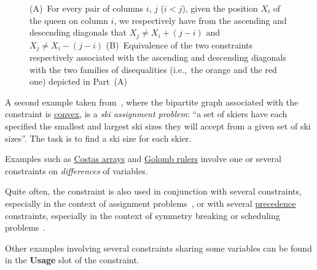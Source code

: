 \begin{ctrdesc}
\begin{figure}[!h]
\caption{\label{fig:alldifferent2a}
(A)~For every pair of columns $i$, $j$ ($i<j$), given the position $X_i$ of the queen on column $i$, we respectively have from the ascending and descending diagonals that $X_j\neq X_i+(j-i)$ and $X_j\neq X_i-(j-i)$
(B)~Equivalence of the two  constraints respectively associated with the ascending and descending diagonals with the two families of disequalities (i.e.,~the orange and the red one) depicted in Part~(A)}
\end{figure}

A second example taken from~\cite{AsratianDenleyHaggkvist98}, where the bipartite graph associated
with the  constraint is \hyperlink{convex_bipartite_graph}{convex}, is a
\emph{ski assignment problem}:
``a set of skiers have each specified the smallest and largest ski sizes they will accept from a given set of ski sizes''.
The task is to find a ski size for each skier.

Examples such as
\hyperlink{Costas_arrays}{Costas arrays} and
\hyperlink{Golomb_ruler}{Golomb rulers}
involve one or several  constraints on \emph{differences} of variables.

Quite often, the  constraint is also used in conjunction
with several \hyperlink{Celement}{} constraints, especially in the context
of assignment problems~\cite[pages 372--374]{Hooker07book},
or with several \hyperlink{Clt}{precedence} constraints, especially in the context
of symmetry breaking or scheduling problems~\cite{BessiereNarodytskaQuimperWalsh11}.

Other examples involving several  constraints sharing some variables
can be found in the {\bf Usage} slot of the \hyperlink{Ck_alldifferent}{}
constraint.


\end{ctrdesc}

